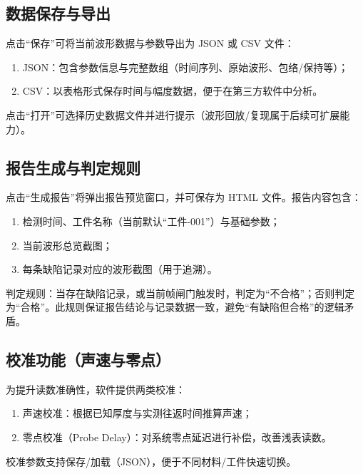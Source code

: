 
\subsection{数据保存与导出}
\par
点击“保存”可将当前波形数据与参数导出为 JSON 或 CSV 文件：
\begin{enumerate}
	\item JSON：包含参数信息与完整数组（时间序列、原始波形、包络/保持等）；
	\item CSV：以表格形式保存时间与幅度数据，便于在第三方软件中分析。
\end{enumerate}
\par
点击“打开”可选择历史数据文件并进行提示（波形回放/复现属于后续可扩展能力）。

\subsection{报告生成与判定规则}
\par
点击“生成报告”将弹出报告预览窗口，并可保存为 HTML 文件。报告内容包含：
\begin{enumerate}
	\item 检测时间、工件名称（当前默认“工件-001”）与基础参数；
	\item 当前波形总览截图；
	\item 每条缺陷记录对应的波形截图（用于追溯）。
\end{enumerate}
\par
判定规则：当存在缺陷记录，或当前帧闸门触发时，判定为“不合格”；否则判定为“合格”。此规则保证报告结论与记录数据一致，避免“有缺陷但合格”的逻辑矛盾。


\subsection{校准功能（声速与零点）}
\par
为提升读数准确性，软件提供两类校准：
\begin{enumerate}
	\item 声速校准：根据已知厚度与实测往返时间推算声速；
	\item 零点校准（Probe Delay）：对系统零点延迟进行补偿，改善浅表读数。
\end{enumerate}
\par
校准参数支持保存/加载（JSON），便于不同材料/工件快速切换。

